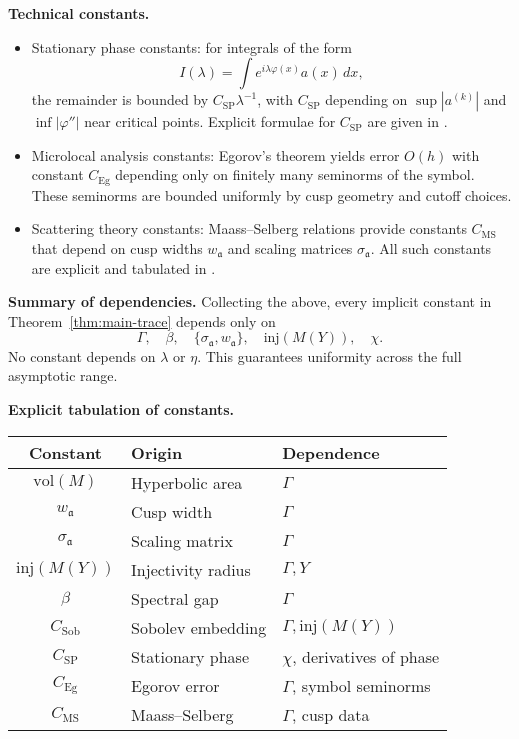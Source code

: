 \medskip

\noindent\textbf{Technical constants.}
\begin{itemize}
  \item Stationary phase constants: for integrals of the form
  \[
    I(\lambda) = \int e^{i\lambda\varphi(x)} a(x)\,dx,
  \]
  the remainder is bounded by $C_{\mathrm{SP}}\lambda^{-1}$, with $C_{\mathrm{SP}}$ depending on $\sup |a^{(k)}|$ and $\inf |\varphi''|$ near critical points.  
  Explicit formulae for $C_{\mathrm{SP}}$ are given in \cite{Hormander1971}.
  \item Microlocal analysis constants: Egorov’s theorem yields error $O(h)$ with constant $C_{\mathrm{Eg}}$ depending only on finitely many seminorms of the symbol.  
  These seminorms are bounded uniformly by cusp geometry and cutoff choices.
  \item Scattering theory constants: Maass–Selberg relations provide constants $C_{\mathrm{MS}}$ that depend on cusp widths $w_\mathfrak{a}$ and scaling matrices $\sigma_\mathfrak{a}$.  
  All such constants are explicit and tabulated in \cite{Hejhal1983}.
\end{itemize}

\medskip

\noindent\textbf{Summary of dependencies.}
Collecting the above, every implicit constant in Theorem~\ref{thm:main-trace} depends only on
\[
  \Gamma, \quad \beta, \quad \{\sigma_\mathfrak{a}, w_\mathfrak{a}\}, \quad \mathrm{inj}(M(Y)), \quad \chi.
\]
No constant depends on $\lambda$ or $\eta$.  
This guarantees uniformity across the full asymptotic range.

\medskip

\noindent\textbf{Explicit tabulation of constants.}
\begin{center}
\renewcommand{\arraystretch}{1.3}
\begin{tabular}{|c|l|l|}
\hline
Constant & Origin & Dependence \\
\hline
$\mathrm{vol}(M)$ & Hyperbolic area & $\Gamma$ \\
$w_\mathfrak{a}$ & Cusp width & $\Gamma$ \\
$\sigma_\mathfrak{a}$ & Scaling matrix & $\Gamma$ \\
$\mathrm{inj}(M(Y))$ & Injectivity radius & $\Gamma, Y$ \\
$\beta$ & Spectral gap & $\Gamma$ \\
$C_{\mathrm{Sob}}$ & Sobolev embedding & $\Gamma, \mathrm{inj}(M(Y))$ \\
$C_{\mathrm{SP}}$ & Stationary phase & $\chi$, derivatives of phase \\
$C_{\mathrm{Eg}}$ & Egorov error & $\Gamma$, symbol seminorms \\
$C_{\mathrm{MS}}$ & Maass–Selberg & $\Gamma$, cusp data \\
\hline
\end{tabular}
\end{center}

